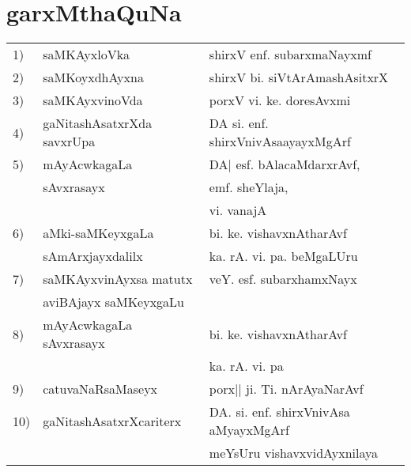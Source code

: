 \chapter{garxMthaQuNa}

\begin{tabular}{>{\rm }ll@{\hspace{1.5cm}}l}
1) & saMKAyxloVka      & shirxV enf. subarxmaNayxmf\\[0.2cm]
2) & saMKoyxdhAyxna    & shirxV bi. siVtArAmashAsitxrX\\[0.2cm]
3) & saMKAyxvinoVda    & porxV vi. ke. doresAvxmi \\[0.2cm]
4) & gaNitashAsatxrXda savxrUpa &  DA si. enf. shirxVnivAsaayayxMgArf\\[0.2cm]
5) & mAyAcwkagaLa  & DA| esf. bAlacaMdarxrAvf,\\   
   &  sAvxrasayx   & \qquad emf. sheYlaja,\\
   &               & \qquad vi. vanajA\\[0.2cm]
6) & aMki-saMKeyxgaLa  & bi. ke. vishavxnAtharAvf \\ 
   & sAmArxjayxdalilx  & ka. rA. vi. pa. beMgaLUru\\[0.2cm]
7) & saMKAyxvinAyxsa matutx & veY. esf. subarxhamxNayx\\
   & aviBAjayx saMKeyxgaLu   &                          \\[0.2cm]
8) & mAyAcwkagaLa sAvxrasayx & bi. ke. vishavxnAtharAvf\\
   &                         & ka. rA. vi. pa\\[0.2cm]
9) & catuvaNaRsaMaseyx       & porx|| ji. Ti. nArAyaNarAvf\\[0.2cm]
10)&gaNitashAsatxrXcariterx  & DA. si. enf. shirxVnivAsa aMyayxMgArf\\
   &                         & meYsUru vishavxvidAyxnilaya      
\end{tabular}
